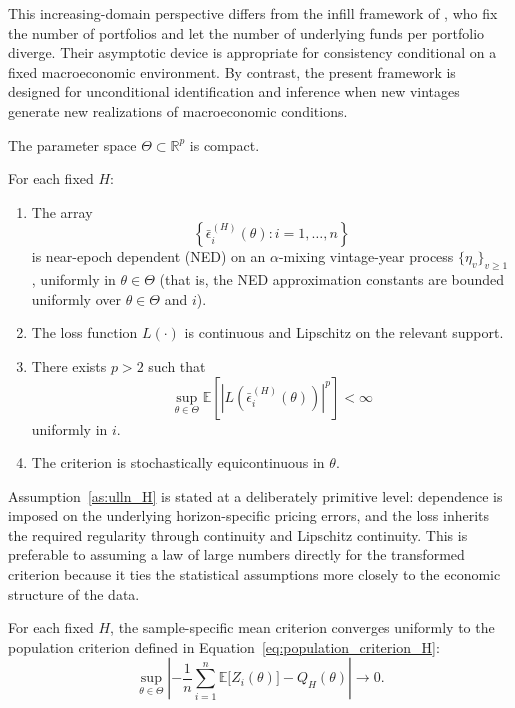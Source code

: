 This increasing-domain perspective differs from the infill framework of \citet{DLP12}, who fix the number of portfolios and let the number of underlying funds per portfolio diverge. Their asymptotic device is appropriate for consistency conditional on a fixed macroeconomic environment. By contrast, the present framework is designed for unconditional identification and inference when new vintages generate new realizations of macroeconomic conditions.

\begin{assume}
	\label{as:compact_theta}
	The parameter space $\Theta \subset \mathbb{R}^p$ is compact.
\end{assume}

\begin{assume}
	\label{as:ulln_H}
	For each fixed \(H\):
	\begin{enumerate}
		\item The array
		\[
		\left\{
		\bar{\epsilon}^{(H)}_i(\theta)
		:
		i=1,\dots,n
		\right\}
		\]
		is near-epoch dependent (NED) on an \(\alpha\)-mixing vintage-year process \(\{\eta_v\}_{v\ge 1}\), uniformly in \(\theta \in \Theta\) (that is, the NED approximation constants are bounded uniformly over \(\theta \in \Theta\) and \(i\)).
		\item The loss function \(L(\cdot)\) is continuous and Lipschitz on the relevant support.
		\item There exists \(p>2\) such that
		\[
		\sup_{\theta \in \Theta}
		\mathbb E
		\left[
		\left|
		L\!\left(\bar{\epsilon}^{(H)}_i(\theta)\right)
		\right|^p
		\right]
		<
		\infty
		\]
		uniformly in \(i\).
		\item The criterion is stochastically equicontinuous in \(\theta\).
	\end{enumerate}
\end{assume}

Assumption~\ref{as:ulln_H} is stated at a deliberately primitive level: dependence is imposed on the underlying horizon-specific pricing errors, and the loss inherits the required regularity through continuity and Lipschitz continuity. This is preferable to assuming a law of large numbers directly for the transformed criterion because it ties the statistical assumptions more closely to the economic structure of the data.

\begin{assume}
	\label{as:population_limit_H}
	For each fixed \(H\), the sample-specific mean criterion converges uniformly to the population criterion defined in Equation~\eqref{eq:population_criterion_H}:
	\[
	\sup_{\theta \in \Theta}
	\left|
	-
	\frac{1}{n}
	\sum_{i=1}^n \mathbb E\bigl[Z_i(\theta)\bigr]
	-
	Q_H(\theta)
	\right|
	\to 0.
	\]
\end{assume}

